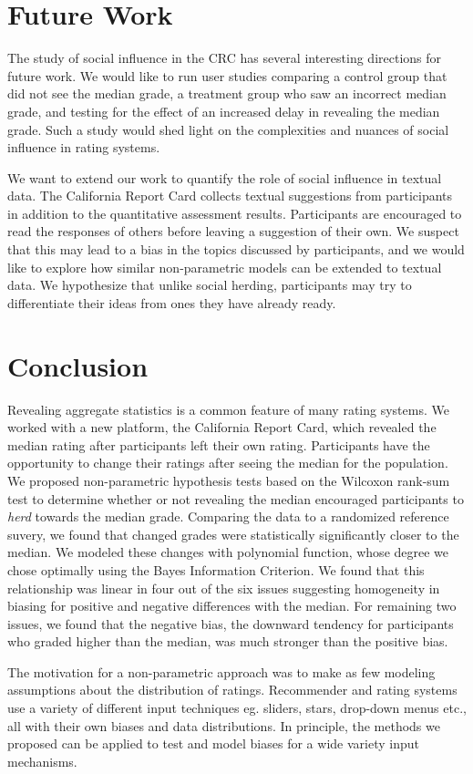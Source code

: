 \section{Future Work}
The study of social influence in the CRC has several interesting directions for future work.
We would like to run user studies comparing a control group that did not see the median grade, 
a treatment group who saw an incorrect median grade, and testing for the effect of an increased delay in revealing the median grade.
Such a study would shed light on the complexities and nuances of social influence in rating systems.
 
We want to extend our work to quantify the role of social influence in textual data. 
The California Report Card collects textual suggestions from participants in addition to the quantitative assessment results. 
Participants are encouraged to read the responses of others before leaving a suggestion of their own.
We suspect that this may lead to a bias in the topics discussed by participants, and we would like to explore how similar non-parametric models can be extended to textual data.
We hypothesize that unlike social herding, participants may try to differentiate their ideas from ones they have already ready.
\section{Conclusion}
Revealing aggregate statistics is a common feature of many rating systems.
We worked with a new platform, the California Report Card, which revealed the median rating after participants left their own rating.
Participants have the opportunity to change their ratings after seeing the median for the population.
We proposed non-parametric hypothesis tests based on the Wilcoxon rank-sum test to determine whether or not revealing the median encouraged participants to \emph{herd} towards the median grade.
Comparing the data to a randomized reference suvery, we found that changed grades were statistically significantly closer to the median.
We modeled these changes with polynomial function, whose degree we chose optimally using the Bayes Information Criterion. 
We found that this relationship was linear in four out of the six issues suggesting homogeneity in biasing for positive and negative differences with the median.
For remaining two issues, we found that the negative bias, the downward tendency for participants who graded higher than the median, was much stronger than the positive bias.

The motivation for a non-parametric approach was to make as few modeling assumptions about the distribution of ratings.
Recommender and rating systems use a variety of different input techniques eg. sliders, stars, drop-down menus etc., all with their own biases and data distributions.
In principle, the methods we proposed can be applied to test and model biases for a wide variety input mechanisms.

